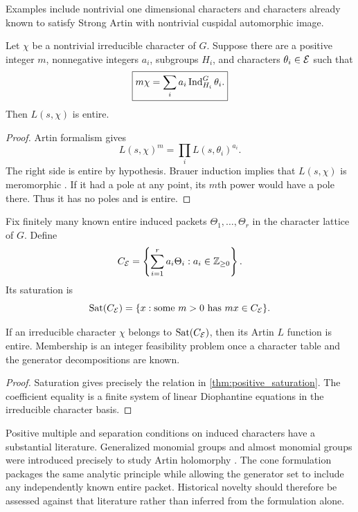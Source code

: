 Examples include nontrivial one dimensional characters and characters already known to satisfy Strong Artin with nontrivial cuspidal automorphic image.

\begin{theorem}\label{thm:positive_saturation}
Let \(\chi\) be a nontrivial irreducible character of \(G\). Suppose there are a positive integer \(m\), nonnegative integers \(a_i\), subgroups \(H_i\), and characters \(\theta_i\in\mathcal E\) such that
\[
 \boxed{
 m\chi
 =
 \sum_i
 a_i\operatorname{Ind}_{H_i}^G\theta_i.
 }
\]
Then \(L(s,\chi)\) is entire.
\end{theorem}

\begin{proof}
Artin formalism gives
\[
 L(s,\chi)^m
 =
 \prod_iL(s,\theta_i)^{a_i}.
\]
The right side is entire by hypothesis. Brauer induction implies that \(L(s,\chi)\) is meromorphic \cite{Brauer1947}. If it had a pole at any point, its \(m\)th power would have a pole there. Thus it has no poles and is entire.
\end{proof}

\begin{definition}\label{def:entire_cone}
Fix finitely many known entire induced packets \(\Theta_1,\ldots,\Theta_r\) in the character lattice of \(G\). Define
\[
 C_{\mathcal E}
 =
 \left\{
 \sum_{i=1}^ra_i\Theta_i:
 a_i\in\mathbb Z_{\geq0}
 \right\}.
\]
Its saturation is
\[
 \operatorname{Sat}(C_{\mathcal E})
 =
 \{x:\text{some }m>0\text{ has }mx\in C_{\mathcal E}\}.
\]
\end{definition}

\begin{corollary}\label{cor:cone_certificate}
If an irreducible character \(\chi\) belongs to \(\operatorname{Sat}(C_{\mathcal E})\), then its Artin \(L\) function is entire. Membership is an integer feasibility problem once a character table and the generator decompositions are known.
\end{corollary}

\begin{proof}
Saturation gives precisely the relation in \cref{thm:positive_saturation}. The coefficient equality is a finite system of linear Diophantine equations in the irreducible character basis.
\end{proof}

\begin{remark}\label{rem:positive_literature}
Positive multiple and separation conditions on induced characters have a substantial literature. Generalized monomial groups and almost monomial groups were introduced precisely to study Artin holomorphy \cite{Konig2010,CimpoeasNicolae2020}. The cone formulation packages the same analytic principle while allowing the generator set to include any independently known entire packet. Historical novelty should therefore be assessed against that literature rather than inferred from the formulation alone.
\end{remark}

